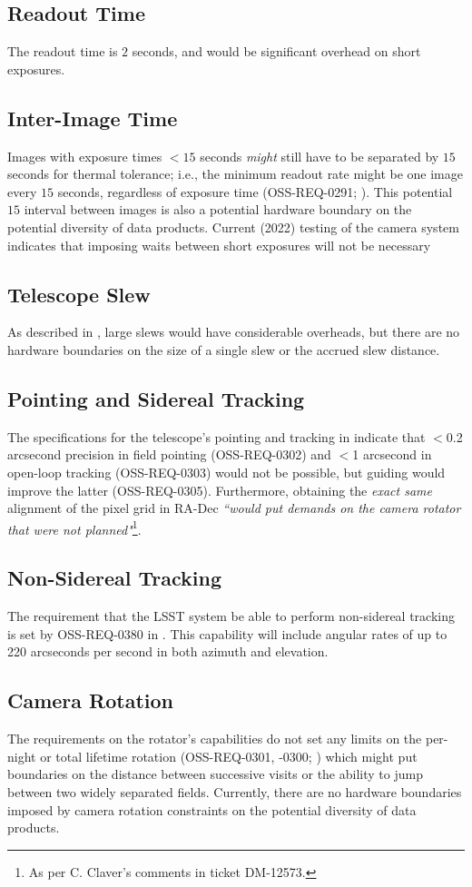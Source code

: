 \subsection{Readout Time}
The readout time is $2$ seconds, and would be significant overhead on short exposures.

\subsection{Inter-Image Time}
Images with exposure times $<15$ seconds {\it might} still have to be separated by $15$ seconds for thermal tolerance; i.e., the minimum readout rate might be one image every $15$ seconds, regardless of exposure time (OSS-REQ-0291; ).
This potential $15$ interval between images is also a potential hardware boundary on the potential diversity of data products.
Current (2022) testing of the camera system indicates that imposing waits between short exposures will not be necessary

\subsection{Telescope Slew}
As described in , large slews would have considerable overheads, but there are no hardware boundaries on the size of a single slew or the accrued slew distance.

\subsection{Pointing and Sidereal Tracking}
The specifications for the telescope's pointing and tracking in  indicate that $<$0.2 arcsecond precision in field pointing (OSS-REQ-0302) and $<$1 arcsecond in open-loop tracking (OSS-REQ-0303) would not be possible, but guiding would improve the latter (OSS-REQ-0305).
Furthermore, obtaining the \emph{exact same} alignment of the pixel grid in RA-Dec {\it ``would put demands on the camera rotator that were not planned"}\footnote{As per C. Claver's comments in ticket DM-12573.}.

\subsection{Non-Sidereal Tracking}
The requirement that the LSST system be able to perform non-sidereal tracking is set by OSS-REQ-0380 in .
This capability will include angular rates of up to 220 arcseconds per second in both azimuth and elevation. 

\subsection{Camera Rotation}
The requirements on the rotator's capabilities do not set any limits on the per-night or total lifetime rotation (OSS-REQ-0301, -0300; ) which might put boundaries on the distance between successive visits or the ability to jump between two widely separated fields.
Currently, there are no hardware boundaries imposed by camera rotation constraints on the potential diversity of data products.
